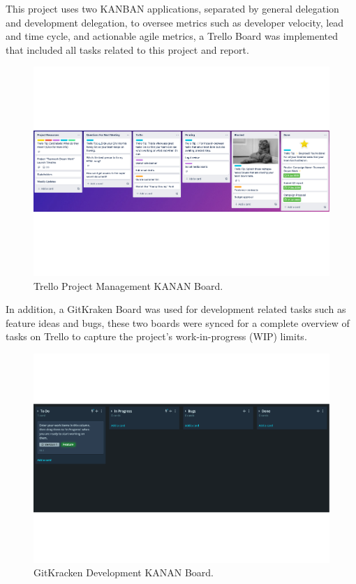 This project uses two KANBAN applications, separated by general delegation and development delegation, to oversee metrics such as developer velocity, lead and time cycle, and actionable agile metrics, a Trello Board was implemented that included all tasks related to this project and report.

\begin{figure}[H]
    \centering
    \includegraphics[width=\textwidth]{figures/chapter-3/TrelloKANBANBoard.pdf}
    \caption[Trello Project Management KANAN Board]{Trello Project Management KANAN Board.
    \label{fig:TrelloKANBANpdf}}
\end{figure}

In addition, a GitKraken Board was used for development related tasks such as feature ideas and bugs, these two boards were synced for a complete overview of tasks on Trello to capture the project’s work-in-progress (WIP) limits.

\begin{figure}[H]
    \centering
    \includegraphics[width=\textwidth]{figures/chapter-3/GitKrackenKANBANpdf.pdf}
    \caption[GitKracken Development KANAN Board]{GitKracken Development KANAN Board.
    \label{fig:GitKrackenKANBANpdf}}
\end{figure}

